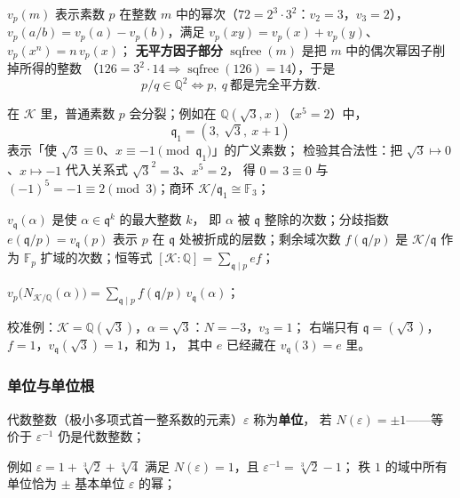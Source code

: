 \documentclass[UTF8,a4paper,11pt]{ctexart}
\begin{document}
$v_p(m)$ 表示素数 $p$ 在整数 $m$ 中的幂次（$72=2^3\cdot3^2$：$v_2=3$，$v_3=2$），
$v_p(a/b)=v_p(a)-v_p(b)$，满足 $v_p(xy)=v_p(x)+v_p(y)$、$v_p(x^n)=n\,v_p(x)$；
\textbf{无平方因子部分} $\operatorname{sqfree}(m)$ 是把 $m$ 中的偶次幂因子削掉所得的整数
（$126=3^2\cdot14\Rightarrow\operatorname{sqfree}(126)=14$），于是
\[
p/q\in\mathbb{Q}^2\iff p,\ q\ \text{都是完全平方数}.
\]

在 $\mathscr{K}$ 里，普通素数 $p$ 会分裂；例如在 $\mathbb{Q}(\sqrt3,x)$（$x^5=2$）中，
\[
\mathfrak{q}_1=(3,\ \sqrt3,\ x+1)
\]
表示「使 $\sqrt3\equiv0$、$x\equiv-1\pmod{\mathfrak{q}_1}$」的广义素数；
检验其合法性：把 $\sqrt3\mapsto0$、$x\mapsto-1$ 代入关系式 $\sqrt3^2=3$、$x^5=2$，
得 $0=3\equiv0$ 与 $(-1)^5=-1\equiv2\pmod3$；商环 $\mathscr{K}/\mathfrak{q}_1\cong\mathbb{F}_3$；\par

\begin{definition}[素理想赋值]
\label{def:vq}
$v_{\mathfrak{q}}(\alpha)$ 是使 $\alpha\in\mathfrak{q}^k$ 的最大整数 $k$，
即 $\alpha$ 被 $\mathfrak{q}$ 整除的次数；分歧指数 $e(\mathfrak{q}/p)=v_{\mathfrak{q}}(p)$
表示 $p$ 在 $\mathfrak{q}$ 处被折成的层数；剩余域次数 $f(\mathfrak{q}/p)$ 是
$\mathscr{K}/\mathfrak{q}$ 作为 $\mathbb{F}_p$ 扩域的次数；恒等式
$[\mathscr{K}:\mathbb{Q}]=\sum_{\mathfrak{q}\mid p}ef$；
\end{definition}

\begin{lemma}[范数--赋值公式]
\label{lem:norm-val}
$v_p\bigl(N_{\mathscr{K}/\mathbb{Q}}(\alpha)\bigr)=\sum_{\mathfrak{q}\mid p}f(\mathfrak{q}/p)\,v_{\mathfrak{q}}(\alpha)$；
\end{lemma}

校准例：$\mathscr{K}=\mathbb{Q}(\sqrt3)$，$\alpha=\sqrt3$：$N=-3$，$v_3=1$；
右端只有 $\mathfrak{q}=(\sqrt3)$，$f=1$，$v_{\mathfrak{q}}(\sqrt3)=1$，和为 $1$，
其中 $e$ 已经藏在 $v_{\mathfrak{q}}(3)=e$ 里。\par

\subsubsection{单位与单位根}

\begin{definition}[单位]
\label{def:unit}
代数整数（极小多项式首一整系数的元素）$\varepsilon$ 称为\textbf{单位}，
若 $N(\varepsilon)=\pm1$——等价于 $\varepsilon^{-1}$ 仍是代数整数；
\end{definition}

例如 $\varepsilon=1+\sqrt[3]2+\sqrt[3]4$ 满足 $N(\varepsilon)=1$，且 $\varepsilon^{-1}=\sqrt[3]2-1$；
秩 $1$ 的域中所有单位恰为 $\pm$ 基本单位 $\varepsilon$ 的幂；\par
\end{document}
